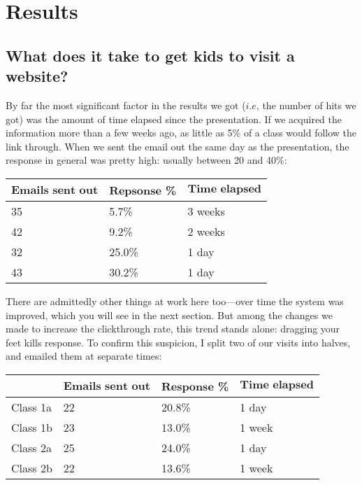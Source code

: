 \documentclass[11pt,a4paper]{article}
\begin{document}
\section{Results}

\subsection{What does it take to get kids to visit a website?}

By far the most significant factor in the results we got ($\textit{i.e}$, the number of hits we got) was the amount of time elapsed since the presentation. If we acquired the information more than a few weeks ago, as little as 5\% of a class would follow the link through. When we sent the email out the same day as the presentation, the response in general was pretty high: usually between 20 and 40\%:

\begin{center}
\begin{tabular}{ l l l }
   $\textbf{Emails sent out}$ & $\textbf{Repsonse}$ \% & $\textbf{Time elapsed}$ \\
   \hline 
   35 & 5.7\% & 3 weeks \\
   42 & 9.2\% & 2 weeks \\
   32 & 25.0\% & 1 day \\
   43 & 30.2\% & 1 day \\
\end{tabular}
\end{center}

There are admittedly other things at work here too---over time the system was improved, which you will see in the next section. But among the changes we made to increase the clickthrough rate, this trend stands alone: dragging your feet kills response. To confirm this suspicion, I split two of our visits into halves, and emailed them at separate times:

\begin{center}
\begin{tabular}{l | l l l }
   & $\textbf{Emails sent out}$ & $\textbf{Response}$ \% & $\textbf{Time elapsed}$ \\
   \hline 
   Class 1a & 22 & 20.8\% & 1 day \\
   Class 1b & 23 & 13.0\% & 1 week \\
   \hline
   Class 2a & 25 & 24.0\% & 1 day \\
   Class 2b & 22 & 13.6\% & 1 week \\
\end{tabular}
\end{center}
\end{document}
